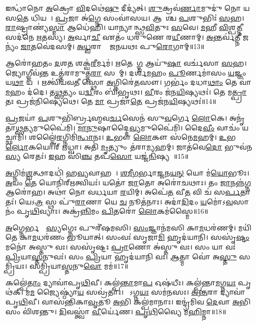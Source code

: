 𑌇𑌨𑍍𑌧𑌾॑𑌨𑍋 \ul{𑌅}𑌕𑍍𑌰𑍋 \ul{𑌵𑌿}𑌦𑌥𑍇॑\ul{𑌷𑍁} 𑌦𑍀𑌦𑍍𑌯॑𑌤𑍍।
\ul{𑌶𑍁}𑌕𑍍𑌰𑌵॑\ul{𑌰𑍍𑌣𑌾}𑌮𑍁𑌦𑍁॑ 𑌨𑍋 𑌯𑌸\ul{𑌤𑍇} 𑌧𑌿𑌯𑌮𑍍᳚।
\ul{𑌪𑍍𑌰}𑌜𑌾 𑌅॑\ul{𑌗𑍍𑌨𑍇} 𑌸𑌂𑌵𑌾॑𑌸𑌯।
𑌆𑌶𑌾᳚𑌶𑍍𑌚 \ul{𑌪}𑌶𑍁𑌭𑌿𑌃॑ \ul{𑌸}𑌹।
\ul{𑌰𑌾}𑌷𑍍𑌟𑍍𑌰𑌾𑌣𑍍𑌯॑\ul{𑌸𑍍𑌮𑌾} 𑌆𑌧𑍇॑𑌹𑌿।
𑌯𑌾𑌨𑍍𑌯𑌾𑌸᳚𑌨𑍍𑌥𑍍𑌸\ul{𑌵𑌿}𑌤𑍁𑌃 \ul{𑌸}𑌵𑍇।
\ul{𑌮}𑌹𑍀 \ul{𑌵𑌿}𑌶𑍍𑌪\ul{𑌤𑍍𑌨𑍀} 𑌸𑌦॑𑌨𑍇 \ul{𑌋}𑌤𑌸𑍍𑌯॑।
\ul{𑌅}𑌰𑍍𑌵𑌾\ul{𑌚𑍀} 𑌏𑌤𑌂॑ 𑌧𑌰𑍁𑌣𑍇 𑌰\ul{𑌯𑍀}𑌣𑌾𑌮𑍍।
\ul{𑌅}𑌨𑍍𑌤𑌰𑍍𑌵॑\ul{𑌤𑍍𑌨𑍀} 𑌜𑌨𑍍𑌯𑌂॑ \ul{𑌜𑌾}𑌤𑌵𑍇॑𑌦𑌸𑌮𑍍।
\ul{𑌅}\ul{𑌧𑍍𑌵}𑌰𑌾𑌣𑌾𑌂᳚ 𑌜𑌨𑌯𑌥𑌃 𑌪𑍁\ul{𑌰𑍋}𑌗𑌾𑌮𑍍॥13॥

𑌆𑌰𑍋॑𑌹𑌤𑌂 \ul{𑌦}𑌶\ul{𑌤}\ul{} 𑌶𑌕𑍍𑌵॑\ul{𑌰𑍀}𑌰𑍍𑌮𑌮॑।
\ul{𑌋}𑌤𑍇𑌨𑌾᳚\ul{𑌗𑍍𑌨} 𑌆𑌯𑍁॑\ul{𑌷𑌾} 𑌵𑌰𑍍𑌚॑𑌸𑌾 \ul{𑌸}𑌹।
𑌜𑍍𑌯𑍋𑌗𑍍𑌜𑍀𑌵॑\ul{𑌨𑍍𑌤} 𑌉𑌤𑍍𑌤॑𑌰𑌾𑌮𑍁𑌤𑍍𑌤\ul{𑌰𑌾}\ul{} 𑌸𑌮𑌾᳚𑌮𑍍।
𑌦𑌰𑍍\mbox{}𑌶॑\ul{𑌮}𑌹𑌂 \ul{𑌪𑍂}𑌰𑍍𑌣𑌮𑌾॑𑌸𑌂 \ul{𑌯}𑌜𑍍𑌞𑌂 𑌯\ul{𑌥𑌾} 𑌯𑌜𑍈᳚।
𑌋𑌤𑍍𑌵𑌿॑𑌯𑌵𑌤𑍀 𑌸𑍍𑌥𑍋 \ul{𑌅}𑌗𑍍𑌨𑌿𑌰𑍇॑𑌤𑌸𑍗।
𑌗𑌰𑍍𑌭𑌂॑ 𑌦𑌧𑌾\ul{𑌥𑌾𑌂} 𑌤𑍇 𑌵𑌾॑\ul{𑌮}𑌹𑌂 𑌦॑𑌦𑍇।
𑌤\ul{𑌥𑍍𑌸}𑌤𑍍𑌯𑌂 𑌯\ul{𑌦𑍍𑌵𑍀}𑌰𑌂 𑌬𑌿॑𑌭𑍃𑌥𑌃।
\ul{𑌵𑍀}𑌰𑌂 𑌜॑𑌨\ul{𑌯𑌿}𑌷𑍍𑌯𑌥𑌃॑।
𑌤𑍇 𑌮\ul{𑌤𑍍𑌪𑍍𑌰𑌾}𑌤𑌃 𑌪𑍍𑌰𑌜॑𑌨𑌿𑌷𑍍𑌯𑍇𑌥𑍇।
𑌤𑍇 \ul{𑌮𑌾} 𑌪𑍍𑌰𑌜𑌾॑\ul{𑌤𑍇} 𑌪𑍍𑌰𑌜॑𑌨\ul{𑌯𑌿}𑌷𑍍𑌯𑌥𑌃॑॥14॥

\ul{𑌪𑍍𑌰}𑌜𑌯𑌾॑ \ul{𑌪}𑌶𑍁𑌭𑌿॑𑌰𑍍𑌬𑍍𑌰𑌹𑍍𑌮𑌵\ul{𑌰𑍍𑌚}𑌸𑍇𑌨॑ 𑌸𑍁\ul{𑌵}𑌰𑍍𑌗𑍇 \ul{𑌲𑍋}𑌕𑍇।
𑌅𑌨𑍃॑𑌤𑌾\ul{𑌥𑍍𑌸}𑌤𑍍𑌯\-𑌮𑍁𑌪𑍈॑𑌮𑌿।
\ul{𑌮𑌾}\ul{𑌨𑍁}𑌷𑌾𑌦𑍍𑌦𑍈\ul{𑌵𑍍𑌯}𑌮𑍁𑌪𑍈॑𑌮𑌿।
𑌦𑍈\ul{𑌵𑍀𑌂} 𑌵𑌾𑌚𑌂॑ 𑌯𑌚𑍍𑌛𑌾𑌮𑌿।
𑌶𑌲𑍍𑌕𑍈॑\ul{𑌰}𑌗𑍍𑌨𑌿𑌮𑌿॑\ul{𑌨𑍍𑌧𑌾}𑌨𑌃।
\ul{𑌉}𑌭𑍗 \ul{𑌲𑍋}𑌕𑍗 𑌸॑𑌨𑍇\ul{𑌮}𑌹𑌮𑍍।
\ul{𑌉}𑌭𑌯𑍋᳚\ul{𑌰𑍍𑌲𑍋}𑌕𑌯𑍋𑌰𑍍॑ \ul{𑌋}𑌧𑍍𑌵𑌾।
𑌅𑌤𑌿॑ \ul{𑌮𑍃}𑌤𑍍𑌯𑍁𑌂 𑌤॑𑌰𑌾\ul{𑌮𑍍𑌯}𑌹𑌮𑍍।
𑌜𑌾𑌤॑𑌵𑍇\ul{𑌦𑍋} 𑌭𑍁𑌵॑𑌨\ul{𑌸𑍍𑌯} 𑌰𑍇𑌤𑌃॑।
\ul{𑌇}𑌹 𑌸𑌿॑\ul{𑌞𑍍𑌚} 𑌤𑌪॑\ul{𑌸𑍋} 𑌯𑌜𑍍𑌜॑\ul{𑌨𑌿}𑌷𑍍𑌯𑌤𑍇᳚॥15॥

\ul{𑌅}𑌗𑍍𑌨𑌿𑌮॑\ul{𑌶𑍍𑌵}𑌤𑍍𑌥𑌾𑌦𑌧𑌿॑ 𑌹\ul{𑌵𑍍𑌯}𑌵𑌾𑌹𑌮𑍍᳚।
\ul{𑌶}\ul{𑌮𑍀}\ul{𑌗}𑌰𑍍𑌭𑌾\ul{𑌜𑍍𑌜}𑌨\ul{𑌯}\ul{𑌨𑍍} 𑌯𑍋 𑌮॑\ul{𑌯𑍋}𑌭𑍂𑌃।
\ul{𑌅}𑌯𑌂 \ul{𑌤𑍇} 𑌯𑍋𑌨𑌿॑𑌰𑍍‌\mbox{}\ul{𑌋}𑌤𑍍𑌵𑌿𑌯𑌃॑।
𑌯𑌤𑍋॑ \ul{𑌜𑌾}𑌤𑍋 𑌅𑌰𑍋॑𑌚𑌥𑌾𑌃।
𑌤𑌂 \ul{𑌜𑌾}𑌨𑌨𑍍𑌨॑\ul{𑌗𑍍𑌨} 𑌆𑌰𑍋॑𑌹।
𑌅𑌥𑌾॑ 𑌨𑍋 𑌵𑌰𑍍𑌧𑌯𑌾 \ul{𑌰}𑌯𑌿𑌮𑍍।
𑌅𑌪𑍇॑\ul{𑌤} 𑌵𑍀\ul{𑌤} 𑌵𑌿 𑌚॑ 𑌸\ul{𑌰𑍍𑌪}𑌤𑌾𑌤𑌃॑।
𑌯𑍇𑌽\ul{𑌤𑍍𑌰} 𑌸𑍍𑌥 𑌪𑍁॑\ul{𑌰𑌾}𑌣𑌾 𑌯𑍇 \ul{𑌚} 𑌨𑍂𑌤॑𑌨𑌾𑌃।
𑌅𑌦𑌾॑\ul{𑌦𑌿}𑌦𑌂 \ul{𑌯}𑌮𑍋॑\-𑌽\ul{𑌵}𑌸𑌾𑌨𑌂॑ 𑌪𑍃\ul{𑌥𑌿}𑌵𑍍𑌯𑌾𑌃।
𑌅𑌕𑍍𑌰॑\ul{𑌨𑍍𑌨𑌿}𑌮𑌂 \ul{𑌪𑌿}𑌤𑌰𑍋॑ \ul{𑌲𑍋}𑌕𑌮॑𑌸𑍍𑌮𑍈॥16॥

\ul{𑌅}𑌗𑍍𑌨𑍇𑌰𑍍𑌭𑌸𑍍𑌮𑌾᳚\ul{𑌸𑍍𑌯}𑌗𑍍𑌨𑍇𑌃 𑌪𑍁𑌰𑍀॑𑌷𑌮𑌸𑌿।
\ul{𑌸𑌂}𑌜𑍍𑌞𑌾𑌨॑𑌮𑌸𑌿 𑌕𑌾\ul{𑌮}𑌧𑌰॑𑌣𑌮𑍍।
𑌮𑌯𑌿॑ 𑌤𑍇 𑌕𑌾\ul{𑌮}𑌧𑌰॑𑌣𑌂 𑌭𑍂𑌯𑌾𑌤𑍍।
𑌸𑌂𑌵𑌃॑ 𑌸𑍃𑌜𑌾\ul{𑌮𑌿} 𑌹𑍃𑌦॑𑌯𑌾𑌨𑌿।
𑌸𑌸𑍃॑\ul{𑌷𑍍𑌟𑌂} 𑌮𑌨𑍋॑ 𑌅𑌸𑍍𑌤𑍁 𑌵𑌃।
𑌸𑌸𑍃॑𑌷𑍍𑌟𑌃 \ul{𑌪𑍍𑌰𑌾}𑌣𑍋 𑌅॑𑌸𑍍𑌤𑍁 𑌵𑌃।
𑌸𑌂 𑌯𑌾 𑌵𑌃॑ \ul{𑌪𑍍𑌰𑌿}𑌯𑌾\ul{𑌸𑍍𑌤}𑌨𑍁𑌵𑌃॑।
𑌸𑌂 \ul{𑌪𑍍𑌰𑌿}𑌯𑌾 𑌹𑍃𑌦॑𑌯𑌾𑌨𑌿 𑌵𑌃।
\ul{𑌆}𑌤𑍍𑌮𑌾 𑌵𑍋॑ 𑌅\ul{𑌸𑍍𑌤𑍁} 𑌸𑌮𑍍𑌪𑍍𑌰𑌿॑𑌯𑌃।
𑌸𑌮𑍍𑌪𑍍𑌰𑌿॑𑌯𑌾\ul{𑌸𑍍𑌤}𑌨𑍁\ul{𑌵𑍋} 𑌮𑌮॑॥17॥

𑌕𑌲𑍍𑌪𑍇॑\ul{𑌤𑌾𑌂} 𑌦𑍍𑌯𑌾𑌵𑌾॑𑌪𑍃\ul{𑌥𑌿}𑌵𑍀।
𑌕𑌲𑍍𑌪॑\ul{𑌨𑍍𑌤𑌾}𑌮𑌾\ul{𑌪} 𑌓𑌷॑𑌧𑍀𑌃।
𑌕𑌲𑍍𑌪॑𑌨𑍍𑌤𑌾\ul{𑌮}𑌗𑍍𑌨\ul{𑌯𑌃} 𑌪𑍃𑌥॑𑌕𑍍।
𑌮\ul{𑌮} 𑌜𑍍𑌯𑍈𑌷𑍍𑌠𑍍𑌯𑌾॑\ul{𑌯} 𑌸𑌵𑍍𑌰॑𑌤𑌾𑌃।
𑌯𑍇᳚𑌽𑌗𑍍𑌨\ul{𑌯𑌃} 𑌸𑌮॑𑌨𑌸𑌃।
\ul{𑌅}\ul{𑌨𑍍𑌤}𑌰𑌾 𑌦𑍍𑌯𑌾𑌵𑌾॑𑌪𑍃\ul{𑌥𑌿}𑌵𑍀।
𑌵𑌾𑌸॑𑌨𑍍𑌤𑌿𑌕𑌾\ul{𑌵𑍃}𑌤𑍂 \ul{𑌅}𑌭𑌿 𑌕𑌲𑍍𑌪॑𑌮𑌾𑌨𑌾𑌃।
𑌇𑌨𑍍𑌦𑍍𑌰॑𑌮𑌿𑌵 \ul{𑌦𑍇}𑌵𑌾 \ul{𑌅}𑌭𑌿 𑌸𑌂 𑌵𑌿॑𑌶𑌨𑍍𑌤𑍁।
\ul{𑌦𑌿}𑌵𑌸𑍍𑌤𑍍𑌵𑌾॑ \ul{𑌵𑍀}𑌰𑍍𑌯𑍇॑𑌣।
\ul{𑌪𑍃}\ul{𑌥𑌿}𑌵𑍍𑌯𑍈 𑌮॑\ul{𑌹𑌿}𑌮𑍍𑌨𑌾॥18॥

